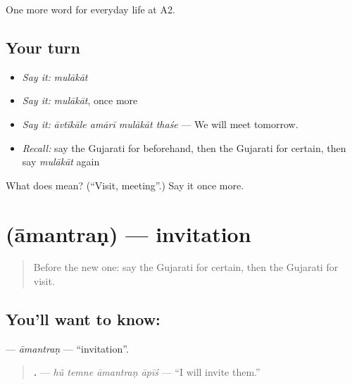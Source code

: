 \begin{grammarlens}[title={What you've built}]
One more word for everyday life at A2.
\end{grammarlens}

\subsection*{Your turn}
\begin{itemize}
\raggedright
  \item \emph{Say it:} \emph{mulākāt}
  \item \emph{Say it:} \emph{mulākāt}, once more
  \item \emph{Say it:} \emph{āvtīkāle amārī mulākāt thaśe} — We will meet tomorrow.
  \item \emph{Recall:} say the Gujarati for beforehand, then the Gujarati for certain, then say \emph{mulākāt} again
\end{itemize}

\begin{tcolorbox}[breakable,colback=teal!4,colframe=teal!35!black,title={Before you move on}]
What does  mean? (\textquotedblleft{}Visit, meeting\textquotedblright{}.) Say it once more.
\end{tcolorbox}
\section[\texorpdfstring{\gu{આમંત્રણ} (āmantraṇ)}{આમંત્રણ (āmantraṇ)}]{ (āmantraṇ) — invitation}

\label{lesson:GU-C180-amantran}



\begin{quote}
Before the new one: say the Gujarati for certain, then the Gujarati for visit.
\end{quote}

\subsection*{You'll want to know: }
\textbf{} — \emph{āmantraṇ} — \textquotedblleft{}invitation\textquotedblright{}.

\begin{quote}
\textbf{   .} — \emph{hũ temne āmantraṇ āpīś} — \textquotedblleft{}I will invite them.\textquotedblright{}
\end{quote}

